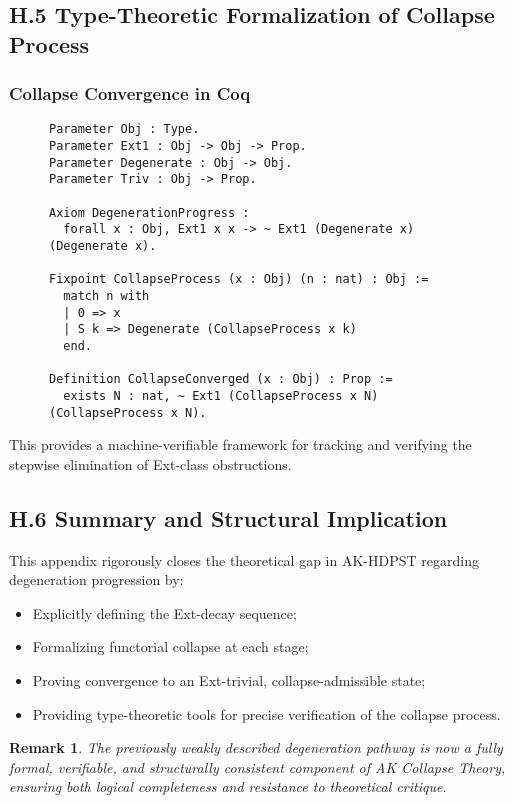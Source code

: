 \documentclass[11pt]{article}
\newtheorem{remark}[theorem]{Remark}
\begin{document}
\subsection*{H.5 Type-Theoretic Formalization of Collapse Process}

\subsubsection*{Collapse Convergence in Coq}

\begin{figure}[h]
\centering
\begin{lstlisting}[language=Coq, caption=Formal Collapse Process Encoding]
Parameter Obj : Type.
Parameter Ext1 : Obj -> Obj -> Prop.
Parameter Degenerate : Obj -> Obj.
Parameter Triv : Obj -> Prop.

Axiom DegenerationProgress :
  forall x : Obj, Ext1 x x -> ~ Ext1 (Degenerate x) (Degenerate x).

Fixpoint CollapseProcess (x : Obj) (n : nat) : Obj :=
  match n with
  | 0 => x
  | S k => Degenerate (CollapseProcess x k)
  end.

Definition CollapseConverged (x : Obj) : Prop :=
  exists N : nat, ~ Ext1 (CollapseProcess x N) (CollapseProcess x N).
\end{lstlisting}
\end{figure}

This provides a machine-verifiable framework for tracking and verifying the stepwise elimination of Ext-class obstructions.

\subsection*{H.6 Summary and Structural Implication}

This appendix rigorously closes the theoretical gap in AK-HDPST regarding degeneration progression by:

\begin{itemize}
    \item Explicitly defining the Ext-decay sequence;
    \item Formalizing functorial collapse at each stage;
    \item Proving convergence to an Ext-trivial, collapse-admissible state;
    \item Providing type-theoretic tools for precise verification of the collapse process.
\end{itemize}

\begin{remark}
The previously weakly described degeneration pathway is now a fully formal, verifiable, and structurally consistent component of AK Collapse Theory, ensuring both logical completeness and resistance to theoretical critique.
\end{remark}
\end{document}
